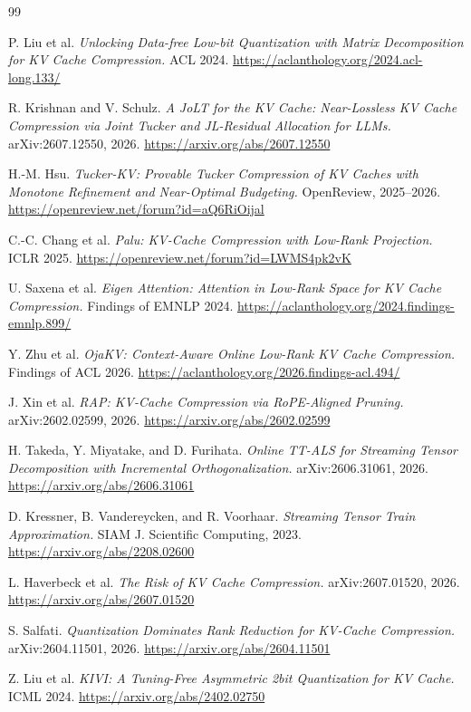 \documentclass[11pt]{article}
\begin{document}
\begin{thebibliography}{99}\small

 P. Liu et al. \emph{Unlocking Data-free Low-bit Quantization with Matrix
Decomposition for KV Cache Compression.} ACL 2024. \url{https://aclanthology.org/2024.acl-long.133/}

 R. Krishnan and V. Schulz. \emph{A JoLT for the KV Cache: Near-Lossless KV Cache
Compression via Joint Tucker and JL-Residual Allocation for LLMs.} arXiv:2607.12550, 2026.
\url{https://arxiv.org/abs/2607.12550}

 H.-M. Hsu. \emph{Tucker-KV: Provable Tucker Compression of KV Caches with
Monotone Refinement and Near-Optimal Budgeting.} OpenReview, 2025--2026.
\url{https://openreview.net/forum?id=aQ6RiOijal}

 C.-C. Chang et al. \emph{Palu: KV-Cache Compression with Low-Rank Projection.}
ICLR 2025. \url{https://openreview.net/forum?id=LWMS4pk2vK}

 U. Saxena et al. \emph{Eigen Attention: Attention in Low-Rank Space for KV Cache
Compression.} Findings of EMNLP 2024. \url{https://aclanthology.org/2024.findings-emnlp.899/}

 Y. Zhu et al. \emph{OjaKV: Context-Aware Online Low-Rank KV Cache Compression.}
Findings of ACL 2026. \url{https://aclanthology.org/2026.findings-acl.494/}

 J. Xin et al. \emph{RAP: KV-Cache Compression via RoPE-Aligned Pruning.}
arXiv:2602.02599, 2026. \url{https://arxiv.org/abs/2602.02599}

 H. Takeda, Y. Miyatake, and D. Furihata. \emph{Online TT-ALS for Streaming
Tensor Decomposition with Incremental Orthogonalization.} arXiv:2606.31061, 2026.
\url{https://arxiv.org/abs/2606.31061}

 D. Kressner, B. Vandereycken, and R. Voorhaar. \emph{Streaming Tensor Train
Approximation.} SIAM J. Scientific Computing, 2023. \url{https://arxiv.org/abs/2208.02600}

 L. Haverbeck et al. \emph{The Risk of KV Cache Compression.}
arXiv:2607.01520, 2026. \url{https://arxiv.org/abs/2607.01520}

 S. Salfati. \emph{Quantization Dominates Rank Reduction for KV-Cache
Compression.} arXiv:2604.11501, 2026. \url{https://arxiv.org/abs/2604.11501}

 Z. Liu et al. \emph{KIVI: A Tuning-Free Asymmetric 2bit Quantization for KV Cache.}
ICML 2024. \url{https://arxiv.org/abs/2402.02750}

\end{thebibliography}
\end{document}
